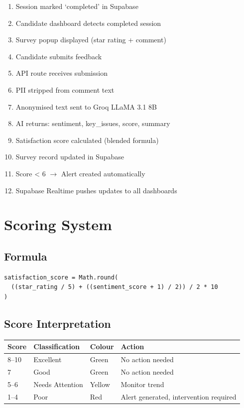 \documentclass[11pt, a4paper]{article}
\begin{document}
\begin{enumerate}[leftmargin=2em]
\item Session marked `completed' in Supabase
\item Candidate dashboard detects completed session
\item Survey popup displayed (star rating + comment)
\item Candidate submits feedback
\item API route receives submission
\item PII stripped from comment text
\item Anonymised text sent to Groq LLaMA 3.1 8B
\item AI returns: sentiment, key\_issues, score, summary
\item Satisfaction score calculated (blended formula)
\item Survey record updated in Supabase
\item Score < 6 $\rightarrow$ Alert created automatically
\item Supabase Realtime pushes updates to all dashboards
\end{enumerate}

\section{Scoring System}

\subsection{Formula}

\begin{lstlisting}
satisfaction_score = Math.round(
  ((star_rating / 5) + ((sentiment_score + 1) / 2)) / 2 * 10
)
\end{lstlisting}

\subsection{Score Interpretation}

\begin{tabularx}{\textwidth}{l l l X}
\toprule
\textbf{Score} & \textbf{Classification} & \textbf{Colour} & \textbf{Action} \\
\midrule
8--10 & Excellent & Green & No action needed \\
7 & Good & Green & No action needed \\
5--6 & Needs Attention & Yellow & Monitor trend \\
1--4 & Poor & Red & Alert generated, intervention required \\
\bottomrule
\end{tabularx}
\end{document}
